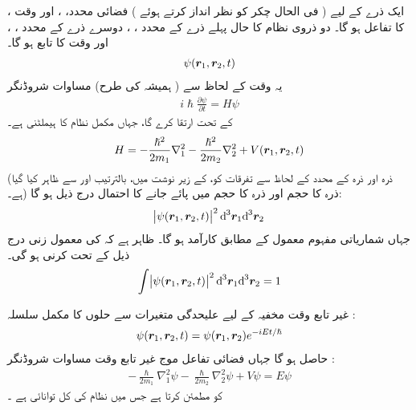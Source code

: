 ایک ذرے کے لیے ( فی الحال چکر کو نظر انداز کرتے ہوئے )       فضائی  محدد، ،  اور وقت  ،  کا تفاعل ہو گا۔ دو ذروی نظام کا حال پہلے ذرے کے محدد ، ،  دوسرے ذرے کے محدد ، ،  اور وقت کا تابع ہو گا۔ 
\begin{align}   
\psi ( {{\boldsymbol{r}}}_1 , {{\boldsymbol{r}}}_2 , t ) 
\end{align}
  یہ وقت کے لحاظ سے  ( ہمیشہ کی طرح) مساوات شروڈنگر 
\begin{align}
i \hslash \frac{ \partial \psi }{ \partial t } = H \psi
\end{align}
کے تحت ارتقا کرے گا،  جہاں  مکمل  نظام کا ہیملٹنی  ہے۔
\begin{equation}
H = - \frac{ \hslash^2 }{ 2 m_1 } \nabla_1^2  -  \frac{ \hslash^2 }{ 2 m_2 }  \nabla_2^2 +  V({{\boldsymbol{r}}}_1 , {{\boldsymbol{r}}}_2 , t )
\end{equation}
(ذرہ    اور  ذرہ     کے محدد کے لحاظ سے  تفرقات  کو،    کے  زیر نوشت میں، بالترتیب    اور      سے ظاہر کیا گیا ہے۔)   ذرہ    کا
 حجم   اور ذرہ    کا حجم  میں  پائے جانے کا احتمال درج ذیل ہو گا:
\begin{align}
\abs{\psi (\kvec{r}_1 , \kvec{r}_2 , t ) }^2  {\dif^{\,3} } { \kvec{r}_1 }  {\dif^{\,3} } { \kvec{r}_2 }
\end{align}
جہاں شماریاتی مفہوم   معمول کے مطابق کارآمد ہو گا۔ ظاہر ہے کہ   کی معمول زنی  درج ذیل کے تحت  کرنی ہو گی۔ 
\begin{align}
\int \abs{\psi ( \kvec{r}_1 , \kvec{r}_2 , t ) }^2 {\dif^{\,3} } {\kvec{r}_1 } {\dif^{\,3} } { \kvec{r}_2 } = 1
\end{align}

غیر تابع وقت مخفیہ کے لیے علیحدگی  متغیرات  سے حلوں کا   مکمل سلسلہ :
\begin{align}
\psi ( {{\boldsymbol{r}}}_1 , {{\boldsymbol{r}}}_2 , t ) =  \psi ( {{\boldsymbol{r}}}_1 , {{\boldsymbol{r}}}_2 ) {e}^{-i E t/\hslash}  
\end{align}
حاصل ہو گا جہاں فضائی  تفاعل موج   غیر تابع وقت مساوات شروڈنگر :
\begin{align}
-\frac{ \hslash }{ 2 m_1 }  {\nabla_1^2} { \psi } - \frac{ \hslash }{ 2 m_2 } \nabla_2^2 { \psi } + V \psi =E\psi
\end{align}
کو مطمئن کرتا ہے جس میں    نظام کی کل توانائی ہے ۔ 

